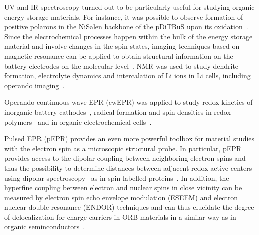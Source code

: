 UV and IR spectroscopy turned out to be particularly useful for studying organic energy-storage materials. For instance, it was possible to observe formation of positive polarons in the NiSalen backbone of the pDiTBuS upon its oxidation~\cite{Dmitrieva2018}.
Since the electrochemical processes happen within the bulk of the energy storage material and involve changes in the spin states, imaging techniques based on magnetic resonance can be applied to obtain structural information on the battery electrodes on the molecular level~\cite{Niemoller2018,Meier2013,Li2019,Bittl2005}. NMR was used to study dendrite formation, electrolyte dynamics and intercalation of Li ions\cite{Kushida1980,Grosu2023a} in Li cells, including operando imaging~\cite{Shi2019}. 


Operando continuous-wave EPR (cwEPR) was applied to study redox kinetics of inorganic battery cathodes~\cite{Niemoller2019}, radical formation and spin densities in redox polymers~\cite{Dmitrieva2018} and in organic electrochemical cells~\cite{huang2016_jpowersources,Kulikov2022}.

Pulsed EPR (pEPR) provides an even more powerful toolbox for material studies with the electron spin as a microscopic structural probe. In particular, pEPR provides access to the dipolar coupling between neighboring electron spins and thus the possibility to determine distances between adjacent redox-active centers using dipolar spectroscopy~\cite{Salikhov1981} as in spin-labelled proteins~\cite{jeschke2012_annrevphyschem,Toropov1998}. In addition, the hyperfine coupling between electron and nuclear spins in close vicinity can be measured by electron spin echo envelope modulation (ESEEM) and electron nuclear double resonance (ENDOR) techniques and can thus elucidate the degree of delocalization for charge carriers in ORB materials in a similar way as in organic seminconductors~\cite{Behrends2011}.


\paragraph*{}
\\




